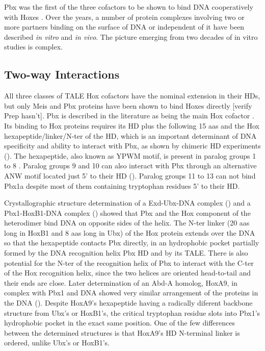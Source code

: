 Pbx was the first of the three cofactors to be shown to bind DNA cooperatively with Hoxes \cite{Chan1994}. Over the years, a number of protein complexes involving two or more partners binding on the surface of DNA or independent of it have been described \textit{in vitro} and \textit{in vivo}. The picture emerging from two decades of in vitro studies is complex. 

\subsection{Two-way Interactions}

All three classes of \ac{TALE} Hox cofactors have the nominal extension in their \acp{HD}, but only Meis and Pbx proteins have been shown to bind Hoxes directly [verify Prep hasn't]. Pbx is described in the literature as being the main Hox cofactor \cite{ref}. Its binding to Hox proteins requires its \ac{HD} plus the following 15 \acp{aa} and the Hox hexapeptide/linker/\ac{N-ter} of the \ac{HD}, which is an important determinant of DNA specificity and ability to interact with Pbx, as shown by chimeric \ac{HD} experiments (\cite{Chang1996,Phelan1997}). The hexapeptide, also known as YPWM motif, is present in paralog groups 1 to 8 \cite{Chang1995, Passner1999}. Paralog groups 9 and 10 can also interact with Pbx through an alternative ANW motif located just 5' to their \ac{HD} (\cite{Chang1996, Shen1997a}). Paralog groups 11 to 13 can not bind Pbx1a despite most of them containing tryptophan residues 5' to their \ac{HD}. 

Crystallographic structure determination of a Exd-Ubx-DNA complex (\cite{Passner1999}) and a Pbx1-HoxB1-DNA complex (\cite{Piper1999}) showed that Pbx and the Hox component of the heterodimer bind DNA on opposite sides of the helix. The \ac{N-ter} linker (20 \acp{aa} long in HoxB1 and 8 \acp{aa} long in Ubx) of the Hox protein extends over the DNA so that the hexapeptide contacts Pbx directly, in an hydrophobic pocket partially formed by the DNA recognition helix Pbx \ac{HD} and by its \ac{TALE}. There is also potential for the \ac{N-ter} of the recognition helix of Pbx to interact with the \ac{C-ter} of the Hox recognition helix, since the two helices are oriented head-to-tail and their ends are close. Later determination of an \ac{Abd-A} homolog, HoxA9, in complex with Pbx1 and DNA showed very similar arrangement of the proteins in the DNA (\cite{LaRonde-LeBlanc2003}). Despite HoxA9's hexapeptide having a radically diferent backbone structure from Ubx's or HoxB1's, the critical tryptophan residue slots into Pbx1's hydrophobic pocket in the exact same position. One of the few differences between the determined structures is that HoxA9's \ac{HD} N-terminal linker is ordered, unlike Ubx's or HoxB1's.

